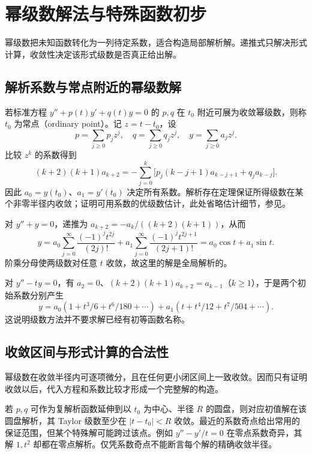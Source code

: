 \setcounter{chapter}{9} %
\chapter{幂级数解法与特殊函数初步}
\label{chap:ode-series}

幂级数把未知函数转化为一列待定系数，适合构造局部解析解。递推式只解决形式计算，收敛性决定该形式级数是否真正给出解。

\section{解析系数与常点附近的幂级数解}
若标准方程 $y''+p(t)y'+q(t)y=0$ 的 $p,q$ 在 $t_0$ 附近可展为收敛幂级数，则称 $t_0$ 为常点（ordinary point）。记 $z=t-t_0$，设
\[
 p=\sum_{j\geq0}p_jz^j,\quad q=\sum_{j\geq0}q_jz^j,\quad y=\sum_{j\geq0}a_jz^j.
\]
比较 $z^k$ 的系数得到
\begin{equation}
 (k+2)(k+1)a_{k+2}
 =-\sum_{j=0}^k\bigl[p_j(k-j+1)a_{k-j+1}+q_ja_{k-j}\bigr].
 \label{eq:ode-power-recursion}
\end{equation}
因此 $a_0=y(t_0)$、$a_1=y'(t_0)$ 决定所有系数。解析存在定理保证所得级数在某个非零半径内收敛；证明可用系数的优级数估计，此处省略估计细节，参见\cite[第4章]{teschl-ode}。

\begin{example}
对 $y''+y=0$，递推为 $a_{k+2}=-a_k/((k+2)(k+1))$，从而
\[
 y=a_0\sum_{j=0}^\infty\frac{(-1)^jt^{2j}}{(2j)!}
 +a_1\sum_{j=0}^\infty\frac{(-1)^jt^{2j+1}}{(2j+1)!}
 =a_0\cos t+a_1\sin t.
\]
阶乘分母使两级数对任意 $t$ 收敛，故这里的解是全局解析的。
\end{example}

对 $y''-ty=0$，有 $a_2=0$、$(k+2)(k+1)a_{k+2}=a_{k-1}$（$k\geq1$），于是两个初始系数分别产生
\[
 y=a_0(1+t^3/6+t^6/180+\cdots)+a_1(t+t^4/12+t^7/504+\cdots).
\]
这说明级数方法并不要求解已经有初等函数名称。

\section{收敛区间与形式计算的合法性}
幂级数在收敛半径内可逐项微分，且在任何更小闭区间上一致收敛。因而只有证明收敛以后，代入方程和系数比较才形成一个完整解的构造。

若 $p,q$ 可作为复解析函数延伸到以 $t_0$ 为中心、半径 $R$ 的圆盘，则对应初值解在该圆盘解析，其 Taylor 级数至少在 $|t-t_0|<R$ 收敛。最近的系数奇点给出常用的保证范围，但某个特殊解可能跨过该点。例如 $y''-y'/t=0$ 在零点系数奇异，其解 $1,t^2$ 却都在零点解析。仅凭系数奇点不能断言每个解的精确收敛半径。


